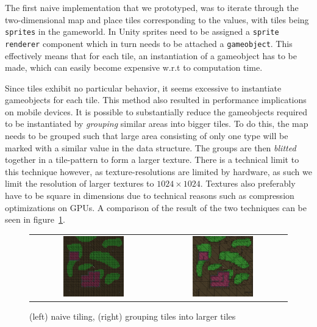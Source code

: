 The first naive implementation that we prototyped, was to iterate through the two-dimensional map and place tiles corresponding to the values, with tiles being \texttt{sprites} in the gameworld.
In Unity sprites need to be assigned a \texttt{sprite renderer} component which in turn needs to be attached a \texttt{gameobject}.
This effectively means that for each tile, an instantiation of a gameobject has
to be made, which can easily become expensive w.r.t to computation time.

Since tiles exhibit no particular behavior, it seems excessive to instantiate gameobjects for each tile.
This method also resulted in performance implications on mobile devices.
It is possible to substantially reduce the gameobjects required to be instantiated by \textit{grouping} similar areas into bigger tiles.
To do this, the map needs to be grouped such that large area consisting of only one type will be marked with a similar value in the data structure.
The groups are then \textit{blitted} together in a tile-pattern to form a larger texture.
There is a technical limit to this technique however, as texture-resolutions are limited by hardware, as such we limit the resolution of larger textures to $1024 \times 1024$.
Textures also preferably have to be square in dimensions due to technical
reasons such as compression optimizations on GPUs.
A comparison of the result of the two techniques can be seen in figure~\ref{fig:grouped_tiling_comparison}.
\begin{figure}[H]
    \centering
    \begin{tabular}{cc}
        \includegraphics[width=0.5\textwidth]{figures/generating_levels/naive-tile.png}
        &
        \includegraphics[width=0.5\textwidth]{figures/generating_levels/grouped-tile.png}
    \end{tabular}
    \caption{(left) naive tiling, (right) grouping tiles into larger tiles}\label{fig:grouped_tiling_comparison}
\end{figure}
